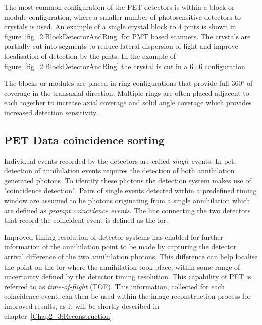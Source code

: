 %
The most common configuration of the PET detectors is within a block or module configuration, where a smaller number of photosensitive detectors to crystals is used. An example of a single crystal block to 4 \glspl{pmt} is shown in figure~\ref{fig_2:BlockDetectorAndRing} for PMT based scanners. The crystals are partially cut into segments to reduce lateral dispersion of light and improve localisation of detection by the \glspl{pmt}. In the example of figure~\ref{fig_2:BlockDetectorAndRing} the crystal is cut in a 6$\times$6 configuration.

The blocks or modules are placed in ring configurations that provide full 360$^{\circ}$ of coverage in the transaxial direction. Multiple rings are often placed adjacent to each together to increase axial coverage and solid angle coverage which provides increased detection sensitivity. 

\subsection{PET Data coincidence sorting}
Individual events recorded by the detectors are called \textit{single} events. In \gls{pet}, detection of annihilation events requires the detection of both annihilation generated photons. To identify these photons the detection system makes use of "coincidence detection". Pairs of single events detected within a predefined timing window are assumed to be photons originating from a single annihilation which are defined as \textit{prompt coincidence events}.
The line connecting the two detectors that record the coincident event is defined as the \gls{lor}.

Improved timing resolution of detector systems has enabled for further information of the annihilation point to be made by capturing the detector arrival difference of the two annihilation photons. This difference can help localise the point on the \gls{lor} where the annihilation took place, within some range of uncertainty defined by the detector timing resolution. This capability of PET is referred to as \textit{time-of-flight} (TOF).
This information, collected for each coincidence event, can then be used within the image reconstruction process for improved results, as it will be shortly described in chapter~\ref{Chap2_3:Reconstruction}.

